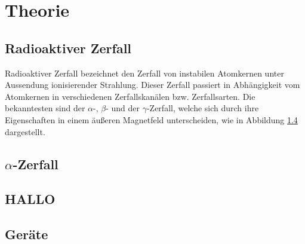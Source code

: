 \documentclass[12pt]{article}
\begin{document}
\newpage
\newpage
\tableofcontents
\newpage  
%
\section{Theorie}
\subsection{Radioaktiver Zerfall}
Radioaktiver Zerfall bezeichnet den Zerfall von instabilen Atomkernen unter Aussendung ionisierender Strahlung. Dieser Zerfall passiert in Abhängigkeit vom Atomkernen in verschiedenen Zerfallskanälen bzw. Zerfallsarten. Die bekanntesten sind der $\alpha$-, $\beta$- und der $\gamma$-Zerfall, welche sich durch ihre Eigenschaften in einem äußeren Magnetfeld unterscheiden, wie in Abbildung \ref{} dargestellt.
\subsection{$\alpha$-Zerfall}
\subsection{HALLO}
\subsection{Geräte}
\end{document}
